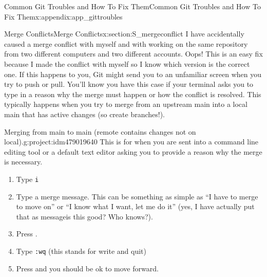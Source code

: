 \documentclass[oneside,10pt,]{book}
\newcommand{\mono}[1]{\texttt{#1}}
\newcommand{\kbd}[1]{\keys{{#1}}}
\begin{document}
\begin{appendixptx}{Common Git Troubles and How To Fix Them}{}{Common Git Troubles and How To Fix Them}{}{}{x:appendix:app_gittroubles}
\begin{sectionptx}{Merge Conflicts}{}{Merge Conflicts}{}{}{x:section:S_mergeconflict}
I have accidentally caused a merge conflict with myself and with working on the same repository from two different computers and two different accounts. Oops! This is an easy fix because I made the conflict with myself so I know which version is the correct one. If this happens to you, Git might send you to an unfamiliar screen when you try to push or pull. You'll know you have this case if your terminal asks you to type in a reason why the merge must happen or how the conflict is resolved. This typically happens when you try to merge from an upstream main into a local main that has active changes (so create branches!).%
\begin{project}{Merging from main to main (remote contains changes not on local).}{g:project:idm479019640}%
This is for when you are sent into a command line editing tool or a default text editor asking you to provide a reason why the merge is necessary.%
\begin{enumerate}[font=\bfseries,label=(\alph*),ref=\alph*]
\item{}Type \mono{i}%
\item{}Type a merge message. This can be something as simple as ``I have to merge to move on'' or ``I know what I want, let me do it'' (yes, I have actually put that as message\textellipsis{}is this good? Who knows?).%
\item{}Press \kbd{esc}.%
\item{}Type \mono{:wq} (this stands for write and quit)%
\item{}Press \kbd{Enter} and you should be ok to move forward.%
\end{enumerate}
\end{project}%
\end{sectionptx}
\end{appendixptx}
%
%
\typeout{************************************************}
\typeout{************************************************}
%
\end{document}
